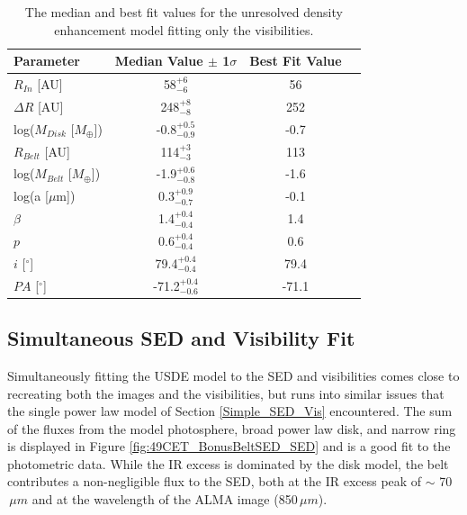\begin{table}
\begin{center}
    \def\arraystretch{1.37}%
    \begin{tabular}{l*{2}{c}r}
    \hline
    Parameter & Median Value $\pm$ 1$\sigma$ & Best Fit Value \\ \hline
     $R_{In}$  [AU] & 58$^{+6}_{-6}$ & 56\\  
     $\Delta R$ [AU] & 248$^{+8}_{-8}$ & 252\\ 
     log($M_{Disk}$ [$M_{\oplus}$]) & -0.8$^{+0.5}_{-0.9}$ & -0.7 \\
     $R_{Belt}$  [AU] & 114$^{+3}_{-3}$ & 113\\ 
     log($M_{Belt}$ [$M_{\oplus}$]) & -1.9$^{+0.6}_{-0.8}$ & -1.6\\
     log(a [$\mu$m]) & 0.3$^{+0.9}_{-0.7}$ & -0.1\\ 
     $\beta$ & 1.4$^{+0.4}_{-0.4}$ & 1.4\\ 
     $p$ & 0.6$^{+0.4}_{-0.4}$ & 0.6\\ 
     $i$ [$^\circ$] & 79.4$^{+0.4}_{-0.4}$ & 79.4 \\ 
     $PA$ [$^\circ$] & -71.2$^{+0.4}_{-0.6}$ & -71.1\\
    \hline
    \end{tabular}
\end{center}
\caption{The median and best fit values for the unresolved density enhancement model fitting only the visibilities.}
\label{tab:49CET_BonusBeltVIS_Table}
\end{table}


\subsection{Simultaneous SED and Visibility Fit}

Simultaneously fitting the USDE model to the SED and visibilities comes close to recreating both the images and the visibilities, but runs into similar issues that the single power law model of Section \ref{Simple_SED_Vis} encountered. The sum of the fluxes from the model photosphere, broad power law disk, and narrow ring is displayed in Figure \ref{fig:49CET_BonusBeltSED_SED} and is a good fit to the photometric data. While the IR excess is dominated by the disk model, the belt contributes a non-negligible flux to the SED, both at the IR excess peak of $\sim$ 70$\,\mu m$ and at the wavelength of the ALMA image (850$\,\mu m$). 

